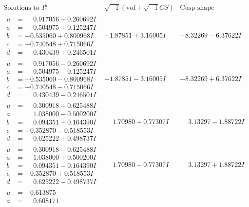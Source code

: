 \documentclass[1p]{elsarticle_modified}
\theoremstyle{definition}
\newcommand{\I}{\sqrt{-1}}
\begin{document}
$$\begin{array}{c|c|c}  
\text{Solutions to }I^u_{1}& \I (\text{vol} + \sqrt{-1}CS) & \text{Cusp shape}\\
 \hline 
\begin{aligned}
u &= \phantom{-}0.917056 + 0.260692 I \\
a &= \phantom{-}0.504975 + 0.125247 I \\
b &= -0.535060 + 0.800968 I \\
c &= -0.740548 + 0.715066 I \\
d &= \phantom{-}0.430439 + 0.246501 I\end{aligned}
 & -1.87851 + 3.16005 I & -8.32269 - 6.37622 I \\ \hline\begin{aligned}
u &= \phantom{-}0.917056 - 0.260692 I \\
a &= \phantom{-}0.504975 - 0.125247 I \\
b &= -0.535060 - 0.800968 I \\
c &= -0.740548 - 0.715066 I \\
d &= \phantom{-}0.430439 - 0.246501 I\end{aligned}
 & -1.87851 - 3.16005 I & -8.32269 + 6.37622 I \\ \hline\begin{aligned}
u &= \phantom{-}0.300918 + 0.625488 I \\
a &= \phantom{-}1.038000 - 0.500200 I \\
b &= \phantom{-}0.094351 + 0.164390 I \\
c &= -0.352870 - 0.518553 I \\
d &= \phantom{-}0.625222 + 0.498737 I\end{aligned}
 & \phantom{-}1.70980 + 0.77307 I & \phantom{-}3.13297 - 1.88722 I \\ \hline\begin{aligned}
u &= \phantom{-}0.300918 - 0.625488 I \\
a &= \phantom{-}1.038000 + 0.500200 I \\
b &= \phantom{-}0.094351 - 0.164390 I \\
c &= -0.352870 + 0.518553 I \\
d &= \phantom{-}0.625222 - 0.498737 I\end{aligned}
 & \phantom{-}1.70980 - 0.77307 I & \phantom{-}3.13297 + 1.88722 I \\ \hline\begin{aligned}
u &= -0.613875\phantom{ +0.000000I} \\
a &= \phantom{-}0.608171\phantom{ +0.000000I} \\

\end{aligned}
\end{array}$$
\end{document}
